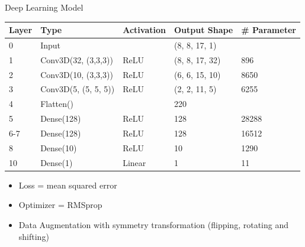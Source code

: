 \documentclass[10pt]{beamer}
\begin{document}
\begin{frame}{Deep Learning Model}
  \centering
  \begin{tabular}{l|l|l|l|l}
    Layer & Type  & Activation & Output Shape & \# Parameter \\
    \hline
    0     & Input &            & (8, 8, 17, 1) &  \\
    1   & Conv3D(32, (3,3,3)) & ReLU & (8, 8, 17, 32)   & 896   \\
    2   & Conv3D(10, (3,3,3)) & ReLU & (6, 6, 15, 10)   & 8650  \\
    3   &  Conv3D(5, (5, 5, 5)) & ReLU & (2, 2, 11, 5)  & 6255  \\
    4     & Flatten()  & & 220 &               \\
    5   & Dense(128)                          & ReLU & 128 & 28288          \\
    6-7 & Dense(128)  & ReLU & 128 & 16512 \\
    8     & Dense(10)                           & ReLU & 10 & 1290         \\
    10     & Dense(1)                            & Linear   & 1 & 11 
  \end{tabular}
  \begin{itemize}
  \item Loss = mean squared error
  \item Optimizer = RMSprop
  \item Data Augmentation with symmetry transformation (flipping, rotating and shifting)
  \end{itemize}
\end{frame}
\end{document}
